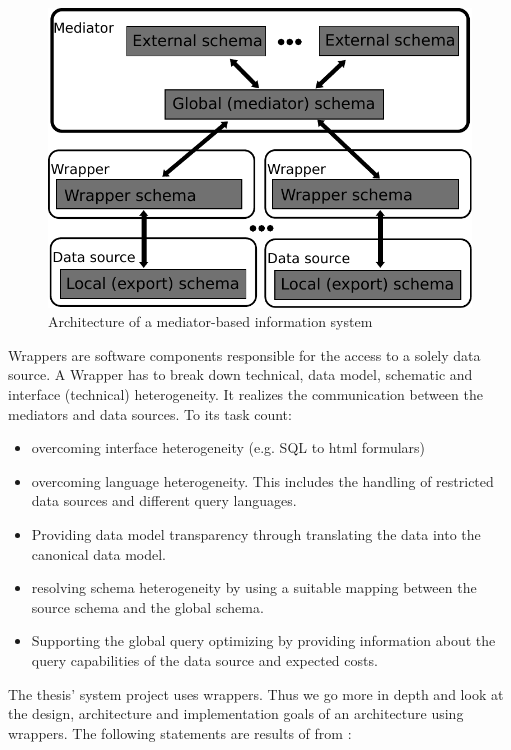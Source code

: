 \begin{figure}[H]
	\begin{center}
		\includegraphics[scale=0.5]{figures/MediatorBasedArchitecture.pdf}
	\end{center}
	\caption{Architecture of a  mediator-based information system \cite[p. 97]{DBLP:books/dp/LeserN2006}}
	\label{MediatorBasedArchitecture}
\end{figure}

Wrappers are software components responsible for the access to a solely data source.
A Wrapper has to break down technical, data model, schematic and interface (technical) heterogeneity. It realizes the communication between the mediators and data sources. To its task count:
\begin{itemize}
\item overcoming interface heterogeneity (e.g. SQL to html formulars)
\item overcoming language heterogeneity. This includes the handling of restricted data sources and different query languages.
\item Providing data model transparency through translating the data into the canonical data model.
\item resolving schema heterogeneity by using a suitable mapping between the source schema and the global schema.
\item Supporting the global query optimizing by providing information about the query capabilities of the data source and expected costs.
\end{itemize}

The thesis' system project uses wrappers. Thus we go more in depth and look at the design, architecture and implementation goals of an architecture using wrappers. The following statements are results of from \cite{Roth:1997:DSW:645923.670992}:

